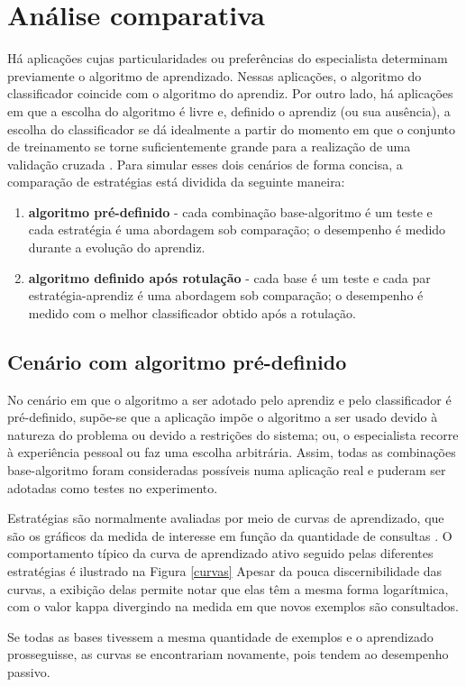 \section{Análise comparativa}\label{comparativa}
Há aplicações cujas particularidades ou preferências do especialista determinam
previamente o algoritmo de aprendizado. 
Nessas aplicações, o algoritmo do classificador coincide com o algoritmo do aprendiz.
Por outro lado, há aplicações em que a escolha do algoritmo é livre e, definido o
aprendiz (ou sua ausência), a escolha do classificador se dá idealmente a partir do
momento em que o conjunto de treinamento se torne suficientemente grande para
a realização de uma validação cruzada .
Para simular esses dois cenários de forma concisa,
a comparação de estratégias está dividida da seguinte maneira:
\begin{enumerate}
  \item \textbf{algoritmo pré-definido} -
  cada combinação base-algoritmo é um teste e cada estratégia é uma abordagem sob comparação;
  o desempenho é medido durante a evolução do aprendiz.
  \item \textbf{algoritmo definido após rotulação} -
  cada base é um teste e cada par estratégia-aprendiz é uma abordagem sob comparação;
  o desempenho é medido com o melhor classificador obtido após a rotulação.
\end{enumerate}

\subsection{Cenário com algoritmo pré-definido}\label{predefinido}

No cenário em que o algoritmo a ser adotado pelo aprendiz e pelo classificador é
pré-definido, supõe-se que a aplicação impõe
o algoritmo a ser usado devido à natureza do problema ou devido a restrições do sistema; ou,
o especialista recorre à experiência pessoal ou faz uma escolha arbitrária.
Assim, todas as combinações base-algoritmo foram consideradas possíveis numa aplicação real
e puderam ser adotadas como testes no experimento.

Estratégias são normalmente avaliadas por meio de curvas de aprendizado,
que são os gráficos da medida de interesse em função da quantidade de consultas
\citep{settles2010active}.
O comportamento típico da curva de aprendizado ativo seguido pelas diferentes estratégias
é ilustrado na Figura \ref{curvas}
Apesar da pouca discernibilidade das curvas, a exibição delas permite notar
que elas têm a mesma forma logarítmica, com o valor kappa divergindo na medida em que novos
exemplos são consultados.

Se todas as bases tivessem a mesma quantidade de exemplos
e o aprendizado prosseguisse, as curvas se encontrariam novamente,
pois tendem ao desempenho passivo.

